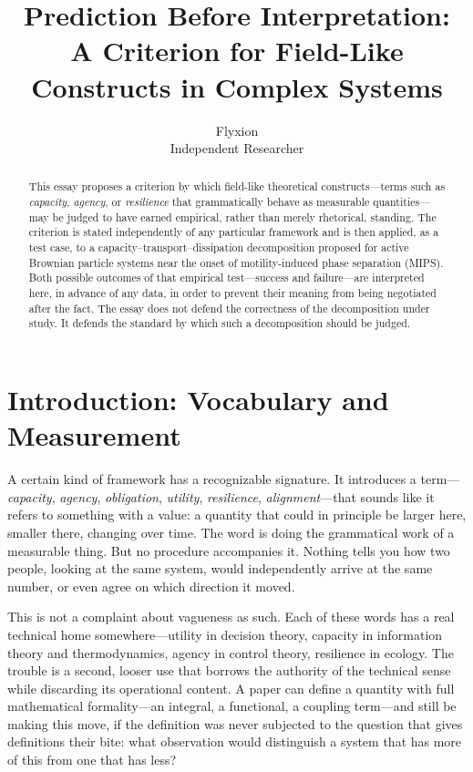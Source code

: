 \documentclass[11pt]{article}
\title{Prediction Before Interpretation:\\ A Criterion for Field-Like Constructs in Complex Systems}
\author{Flyxion \\ \small Independent Researcher}
\date{}
\begin{document}
\maketitle

\begin{abstract}
\noindent This essay proposes a criterion by which field-like theoretical constructs---terms such as \emph{capacity}, \emph{agency}, or \emph{resilience} that grammatically behave as measurable quantities---may be judged to have earned empirical, rather than merely rhetorical, standing. The criterion is stated independently of any particular framework and is then applied, as a test case, to a capacity--transport--dissipation decomposition proposed for active Brownian particle systems near the onset of motility-induced phase separation (MIPS). Both possible outcomes of that empirical test---success and failure---are interpreted here, in advance of any data, in order to prevent their meaning from being negotiated after the fact. The essay does not defend the correctness of the decomposition under study. It defends the standard by which such a decomposition should be judged.
\end{abstract}

\section{Introduction: Vocabulary and Measurement}

A certain kind of framework has a recognizable signature. It introduces a term---\emph{capacity}, \emph{agency}, \emph{obligation}, \emph{utility}, \emph{resilience}, \emph{alignment}---that sounds like it refers to something with a value: a quantity that could in principle be larger here, smaller there, changing over time. The word is doing the grammatical work of a measurable thing. But no procedure accompanies it. Nothing tells you how two people, looking at the same system, would independently arrive at the same number, or even agree on which direction it moved.

This is not a complaint about vagueness as such. Each of these words has a real technical home somewhere---utility in decision theory, capacity in information theory and thermodynamics, agency in control theory, resilience in ecology. The trouble is a second, looser use that borrows the authority of the technical sense while discarding its operational content. A paper can define a quantity with full mathematical formality---an integral, a functional, a coupling term---and still be making this move, if the definition was never subjected to the question that gives definitions their bite: what observation would distinguish a system that has more of this from one that has less?
\end{document}
